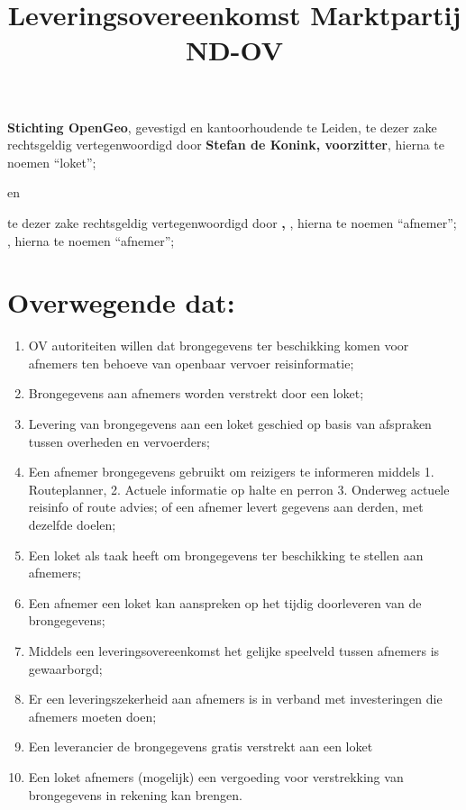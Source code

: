 \documentclass[10pt, a4paper]{article}
\title{Leveringsovereenkomst Marktpartij ND-OV\vspace{-2ex}}
\begin{document}
\maketitle
\thispagestyle{empty}
\pagestyle{empty}
\textbf{Stichting OpenGeo}, gevestigd en kantoorhoudende te Leiden, te dezer zake rechtsgeldig vertegenwoordigd door \textbf{Stefan de Konink, voorzitter}, hierna te noemen ``loket'';
\begin{center}
en\\
\end{center}
\ifdefined\onderneming
    \textbf{\onderneming} te dezer zake rechtsgeldig vertegenwoordigd door \textbf{\tekenbevoegd, \functie}, hierna te noemen ``afnemer'';
\else
    \textbf{\tekenbevoegd}, hierna te noemen ``afnemer'';
\fi

\section*{Overwegende dat:}
\begin{enumerate}
\item OV autoriteiten willen dat brongegevens ter beschikking komen voor afnemers ten behoeve van openbaar vervoer reisinformatie;
\item Brongegevens aan afnemers worden verstrekt door een loket;
\item Levering van brongegevens aan een loket geschied op basis van afspraken tussen overheden en vervoerders;
\item Een afnemer brongegevens gebruikt om reizigers te informeren middels 1. Routeplanner, 2. Actuele informatie op halte en perron 3. Onderweg actuele reisinfo of route advies; of een afnemer levert gegevens aan derden, met dezelfde doelen;
\item Een loket als taak heeft om brongegevens ter beschikking te stellen aan afnemers;
\item Een afnemer een loket kan aanspreken op het tijdig doorleveren van de brongegevens;
\item Middels een leveringsovereenkomst het gelijke speelveld tussen afnemers is gewaarborgd;
\item Er een leveringszekerheid aan afnemers is in verband met investeringen die afnemers moeten doen;
\item Een leverancier de brongegevens gratis verstrekt aan een loket
\item Een loket afnemers (mogelijk) een vergoeding voor verstrekking van brongegevens in rekening kan brengen.
\end{enumerate}
\end{document}
